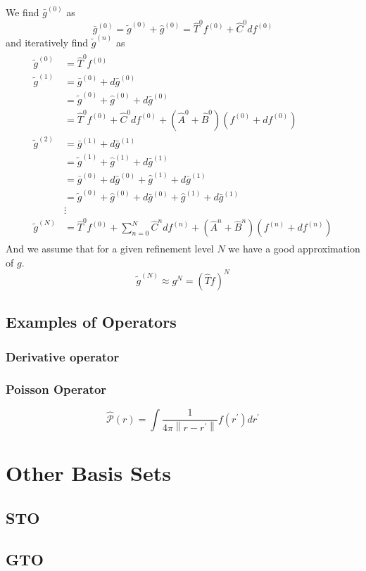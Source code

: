 \documentclass[../master_thesis.tex]{subfiles}
\begin{document}
We find $\bar{g}^{(0)}$ as
\begin{equation}
  \bar{g}^{(0)} =  \tilde{g}^{(0)} + \hat{g}^{(0)} = \hat{T}^{0}f^{(0)} + \hat{C}^{0}df^{(0)}
\end{equation}
and iteratively find $\tilde{g}^{(n)}$ as \cite{Frediani:2013}
\begin{align}
  \begin{split}
    \tilde{g}^{(0)} &= \hat{T}^{0}f^{(0)} \\
    \tilde{g}^{(1)} &= \bar{g}^{(0)} + d\bar{g}^{(0)} \\
    &= \tilde{g}^{(0)} + \hat{g}^{(0)} + d\bar{g}^{(0)}\\
    &= \hat{T}^{0}f^{(0)} + \hat{C}^{0}df^{(0)} + \left(\hat{A}^{0} + \hat{B}^{0}\right)\left(f^{(0)} + df^{(0)}\right)\\
    \tilde{g}^{(2)} &= \bar{g}^{(1)} + d\bar{g}^{(1)}\\
    &= \tilde{g}^{(1)} + \hat{g}^{(1)} + d\bar{g}^{(1)} \\
    &= \bar{g}^{(0)} + d\bar{g}^{(0)} + \hat{g}^{(1)} + d\bar{g}^{(1)}\\
    &= \tilde{g}^{(0)} + \hat{g}^{(0)} + d\bar{g}^{(0)} + \hat{g}^{(1)} + d\bar{g}^{(1)}\\
    &\vdots\\
    \tilde{g}^{(N)} &= \hat{T}^{0}f^{(0)} + \sum^N_{n=0}\hat{C}^{n}df^{(n)} + \left(\hat{A}^{n} + \hat{B}^{n}\right)\left(f^{(n)}
    + df^{(n)}\right)
  \end{split}
\end{align}
And we assume that for a given refinement level $N$ we have a good approximation of
$g$.
\begin{equation}
  \tilde{g}^{(N)} \approx g^{N} = (\hat{T}f)^N
\end{equation}
\subsection{Examples of Operators}
\subsubsection{Derivative operator}

\subsubsection{Poisson Operator}

\begin{equation}\label{eq:Poissonopmw}
\hat{\mathscr{P}}(r)=\int \frac{1}{4 \pi\left\|r-r^{\prime}\right\|} f\left(r^{\prime}\right)
d r^{\prime}
\end{equation}

\section{Other Basis Sets}
\subsection{\ac{STO}}
\subsection{\ac{GTO}}


\biblio
\end{document}
